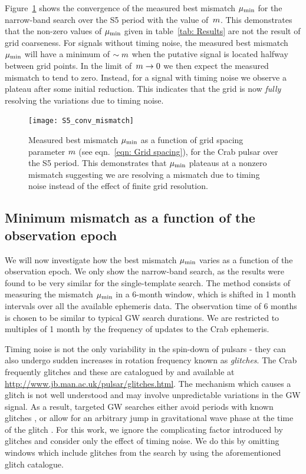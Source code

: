 \documentclass[../full_thesis/full_thesis.tex]{subfiles}
\begin{document}
Figure~\ref{fig: conv} shows the convergence of the measured best mismatch
$\mu_{\mathrm{min}}$ for the narrow-band search over the S5 period with the value
of~$m$.  This demonstrates that the non-zero values of $\mu_{\mathrm{min}}$ given in
table~\ref{tab: Results} are not the result of grid coarseness.  For signals
without timing noise, the measured best mismatch $\mu_{\mathrm{min}}$ will have a minimum
of $\sim m$ when the putative signal is located halfway between grid
points. In the limit of~$m \rightarrow 0$ we then expect the measured
mismatch to tend to zero. Instead, for a signal with timing noise we observe a
plateau after some initial reduction. This indicates that the grid is now
\emph{fully} resolving the variations due to timing noise.
\begin{figure}[htb]
\centering
\texttt{[image: S5\_conv\_mismatch]}
\caption{Measured best mismatch $\mu_{\mathrm{min}}$ as a function
of grid spacing parameter $m$ (see eqn.~\eqref{eqn: Grid spacing}), for the Crab pulsar over the S5 period.
    This demonstrates that $\mu_{\mathrm{min}}$ plateaus at a nonzero mismatch suggesting
    we are resolving a mismatch due to timing noise instead of the effect of finite
    grid resolution.}
\label{fig: conv}
\end{figure}





\subsection{Minimum mismatch as a function of the observation epoch}
\label{sec: Minimum mismatch as a function of the observation epoch}

We will now investigate how the best mismatch $\mu_{\mathrm{min}}$ varies as a function of
the observation epoch. We only show the narrow-band search, as the results were
found to be very similar for the single-template search. The method consists of
measuring the mismatch $\mu_{\mathrm{min}}$ in a 6-month window, which is shifted in 1
month intervals over all the available ephemeris data. The observation time of
6 months is chosen to be similar to typical GW search durations. We are
restricted to multiples of 1 month by the frequency of updates to the Crab
ephemeris.

Timing noise is not the only variability in the spin-down of pulsars - they can
also undergo sudden increases in rotation frequency known as \emph{glitches}.
The Crab frequently glitches and these are catalogued by \citet{Espinoza2011}
and available at \url{http://www.jb.man.ac.uk/pulsar/glitches.html}.
The mechanism which causes a glitch is not well understood and may involve
unpredictable variations in the GW signal. As a result, targeted GW searches
either avoid periods with known glitches \citep{ligo2008}, or
allow for an arbitrary jump in gravitational wave phase at the time of
the glitch \citep{ligo2010}. For this work, we ignore
the complicating factor introduced by glitches and consider
only the effect of timing noise. We do this by
omitting windows which include glitches from the search by using
the aforementioned glitch catalogue.
\end{document}
